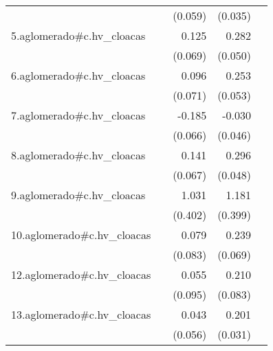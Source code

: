{\begin{longtable}{l*{4}{D{.}{.}{-1}}}
            &                     &     (0.059)         &     (0.035)         &                     \\
\addlinespace
5.aglomerado#c.hv\_cloacas&                     &       0.125         &       0.282\sym{***}&                     \\
            &                     &     (0.069)         &     (0.050)         &                     \\
\addlinespace
6.aglomerado#c.hv\_cloacas&                     &       0.096         &       0.253\sym{***}&                     \\
            &                     &     (0.071)         &     (0.053)         &                     \\
\addlinespace
7.aglomerado#c.hv\_cloacas&                     &      -0.185\sym{**} &      -0.030         &                     \\
            &                     &     (0.066)         &     (0.046)         &                     \\
\addlinespace
8.aglomerado#c.hv\_cloacas&                     &       0.141\sym{*}  &       0.296\sym{***}&                     \\
            &                     &     (0.067)         &     (0.048)         &                     \\
\addlinespace
9.aglomerado#c.hv\_cloacas&                     &       1.031\sym{*}  &       1.181\sym{**} &                     \\
            &                     &     (0.402)         &     (0.399)         &                     \\
\addlinespace
10.aglomerado#c.hv\_cloacas&                     &       0.079         &       0.239\sym{***}&                     \\
            &                     &     (0.083)         &     (0.069)         &                     \\
\addlinespace
12.aglomerado#c.hv\_cloacas&                     &       0.055         &       0.210\sym{*}  &                     \\
            &                     &     (0.095)         &     (0.083)         &                     \\
\addlinespace
13.aglomerado#c.hv\_cloacas&                     &       0.043         &       0.201\sym{***}&                     \\
            &                     &     (0.056)         &     (0.031)         &                     \\

\end{longtable}}
